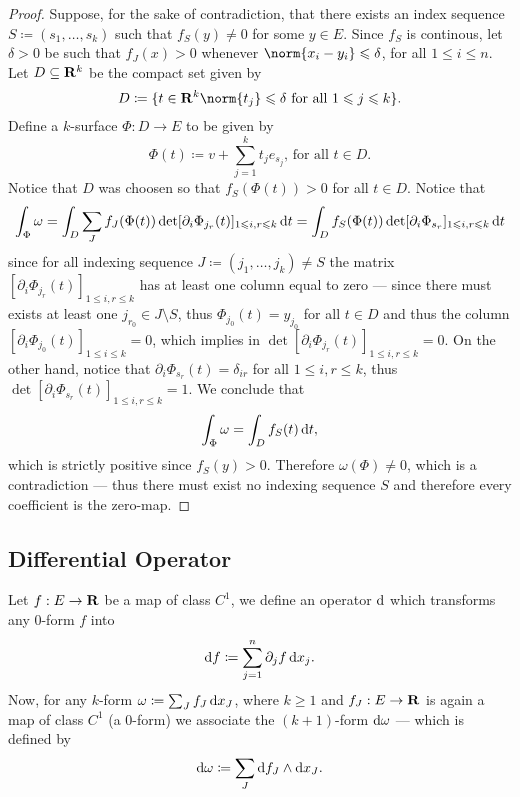 \begin{proof}
Suppose, for the sake of contradiction, that there exists an index sequence \(S
\coloneq (s_1, \dots, s_{k})\) such that \(f_{S}(y) \neq 0\) for some \(y \in
E\). Since \(f_{S}\) is continous, let \(\delta > 0\) be such that \(f_J(x) >
0\) whenever \(\norm{x_i - y_i} \leq \delta\), for all \(1 \leq i \leq n\). Let
\(D \subseteq \mathbf{R}^k\) be the compact set given by
\[
  D \coloneq \{t \in \R^{k} \colon \norm{t_j} \leq \delta
  \text{ for all } 1 \leq j \leq k\}.
\]
Define a \(k\)-surface \(\Phi: D \to E\) to be given by
\[
  \Phi(t) \coloneq v + \sum_{j=1}^k t_j e_{s_j}\text{, for all } t \in D.
\]
Notice that \(D\) was choosen so that \(f_S(\Phi(t)) > 0\) for all \(t \in
D\). Notice that
\[
  \int_{\Phi} \omega = \int_D \sum_J f_J(\Phi(t))
  \det[\partial_i \Phi_{j_r}(t)]_{1 \leqslant i, r \leqslant k}\, \mathrm{d} t
  = \int_D f_S(\Phi(t)) \det[\partial_i \Phi_{s_r}]_{1 \leqslant i, r \leqslant k}\, \mathrm{d} t
\]
since for all indexing sequence \(J \coloneq (j_1, \dots, j_k) \neq S\)
the matrix \([\partial_i \Phi_{j_r}(t)]_{1 \leq i, r \leq k}\) has at least one
column equal to zero --- since there must exists at least one \(j_{r_0} \in J
\setminus S\), thus \(\Phi_{j_0}(t) = y_{j_0}\) for all \(t \in D\) and thus the
column \([\partial_i \Phi_{j_0}(t)]_{1 \leq i \leq k} = 0\), which implies in
\(\det [\partial_i \Phi_{j_r}(t)]_{1 \leq i, r \leq k} = 0\). On the other hand,
notice that \(\partial_i \Phi_{s_r}(t) = \delta_{i r}\) for all \(1 \leq i, r
\leq k\), thus \(\det [\partial_i \Phi_{s_r}(t)]_{1 \leq i, r \leq k} = 1\). We
conclude that
\[
  \int_{\Phi} \omega = \int_D f_S(t)\, \mathrm{d} t,
\]
which is strictly positive since \(f_S(y) > 0\). Therefore \(\omega(\Phi) \neq
0\), which is a contradiction --- thus there must exist no indexing sequence
\(S\) and therefore every coefficient is the zero-map.
\end{proof}

\subsection{Differential Operator}

\begin{definition}
\label{def:differential-operator-form}
Let \(f: E \to \mathbf{R}\) be a map of class \(C^1\), we define an operator \(\mathrm{d}\)
which transforms any \(0\)-form \(f\) into
\[
  \mathrm{d} f \coloneq \sum_{j=1}^n \partial_j f\, \mathrm{d} x_j.
\]
Now, for any \(k\)-form \(\omega \coloneq \sum_J f_J\, \mathrm{d} x_J\), where \(k
\geq 1\) and \(f_J: E \to \mathbf{R}\) is again a map of class \(C^1\) (a \(0\)-form) we
associate the \((k+1)\)-form \(\mathrm{d} \omega\) --- which is defined by
\[
  \mathrm{d} \omega \coloneq \sum_J \mathrm{d} f_J \wedge \mathrm{d} x_{J}.
\]
\end{definition}

